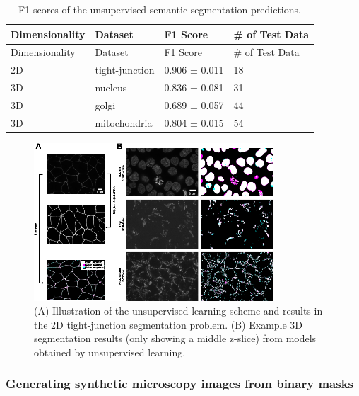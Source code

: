\begin{longtable}[]{@{}llll@{}}
\caption{F1 scores of the unsupervised semantic segmentation predictions. \label{tbl:unsuper}}\label{tbl:unsuper}\tabularnewline
\toprule()
Dimensionality & Dataset & F1 Score & \# of Test Data \\
\midrule()
\endfirsthead
\toprule()
Dimensionality & Dataset & F1 Score & \# of Test Data \\
\midrule()
\endhead
2D & tight-junction & 0.906 ± 0.011 & 18 \\
3D & nucleus & 0.836 ± 0.081 & 31 \\
3D & golgi & 0.689 ± 0.057 & 44 \\
3D & mitochondria & 0.804 ± 0.015 & 54 \\
\bottomrule()
\end{longtable}

\begin{figure}
\hypertarget{fig:unsupervised}{%
\centering
\includegraphics[width=0.8\textwidth,height=\textheight]{images/unsupervised_seg_justin.png}
\caption{(A) Illustration of the unsupervised learning scheme and results in the 2D tight-junction segmentation problem. (B) Example 3D segmentation results (only showing a middle z-slice) from models obtained by unsupervised learning.}\label{fig:unsupervised}
}
\end{figure}

\hypertarget{generating-synthetic-microscopy-images-from-binary-masks}{%
\subsubsection{Generating synthetic microscopy images from binary masks}\label{generating-synthetic-microscopy-images-from-binary-masks}}


